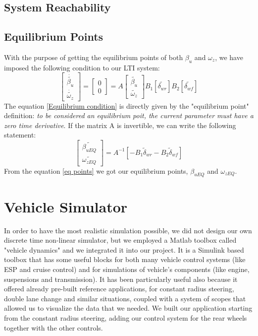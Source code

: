 \documentclass[a4paper,12pt,titlepage]{report}
\numberwithin{figure}{section}
\begin{document}
\section{System Reachability}
\section{Equilibrium Points}
	With the purpose of getting the equilibrium points of both $\beta_{u}$ and $\omega_{z}$, we have imposed the following condition to our LTI system:
		\begin{equation} \label{Equilibrium condition}
			\begin{bmatrix}
				\dot{\tilde{\beta_{u}}} \\
				\dot{\tilde{\omega_{z}}}
			\end{bmatrix} =
			\begin{bmatrix}
				0 \\
				0
			\end{bmatrix} = A
			\begin{bmatrix}
				\tilde{\beta_{u}} \\
				\tilde{\omega_{z}}
			\end{bmatrix} 
			B_{1}[\tilde{\delta_{wr}}] B_{2}[\tilde{\delta_{wf}}]
		\end{equation}
	The equation \ref{Equilibrium condition} is directly given by the "equilibrium point" definition: \textit{to be considered an equilibrium poit, the current parameter must have a zero time derivative}. If the matrix A is invertible, we can write the following statement:
		\begin{equation} \label{eq points}
			\begin{bmatrix}
				\tilde{\beta_{uEQ}} \\
				\tilde{\omega_{zEQ}}
			\end{bmatrix} = 
			A^{-1}[-B_{1} \tilde\delta_{wr} - B_{2} \tilde\delta_{wf}]
		\end{equation}
	From the equation \ref{eq points} we got our equilibrium points, $\beta_{uEQ}$ and $\omega_{zEQ}$.
\chapter{Vehicle Simulator}
	In order to have the most realistic simulation possible, we did not design our own discrete time non-linear simulator, but we employed a Matlab toolbox called "vehicle dynamics" and we integrated it into our project. It is a Simulink based toolbox that has some useful blocks for both many vehicle control systems (like ESP and cruise control) and for simulations of vehicle's components (like engine, suspensions and transmission). 
	It has been particularly useful also because it offered already pre-built reference applications, for constant radius steering, double lane change and similar situations, coupled with a system of scopes that allowed us to visualize the data that we needed. We built our application starting from the constant radius steering, adding our control system for the rear wheels together with the other controls.
\end{document}
